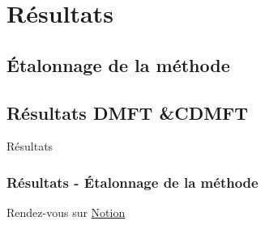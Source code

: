 
\section{Résultats}

\subsection{Étalonnage de la méthode}

\subsection{Résultats DMFT \&\;CDMFT}

\begin{frame}
    \vfill
    \begin{center}
        \large
        Résultats
    \end{center}
    \vfill
\end{frame}

\begin{frame}
    \frametitle{Résultats - Étalonnage de la méthode}
    \vfill
    \centering
    Rendez-vous sur \href{https://www.notion.so/A2024-87fcc14d1ac34253b8b1da3adbef9ace}{\textcolor{vibrant_green}{Notion}}
    \vfill
\end{frame}
